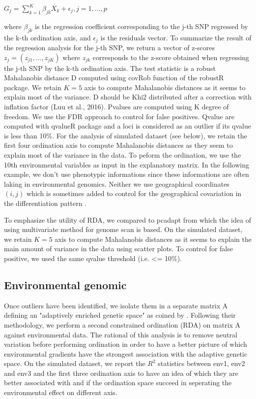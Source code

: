 \documentclass[nogrid]{MBE}%
\begin{document}
$G_j = \sum^{K}_{k=1}\beta_{jk}X_{k}+\epsilon_{j}, j=1,...,p$

where $\beta_{jk}$ is the regression coefficient corresponding to the j-th SNP regressed by the k-th ordination axis, and $\epsilon_{j}$ is the residuals vector. To summarize the result of the regression analysis for the j-th SNP, we return a vector of z-scores $z_{j} = (z_{j1}, ..., z_{jK})$ where $z_{jk}$ corresponds to the z-score obtained when regressing the j-th SNP by the k-th ordination axis.
The test statistic is a robust Mahalanobis distance D computed using covRob function of the robustR package. We retain $K=5$ axis to compute Mahalanobis distances as it seems to explain most of the variance. D should be Khi2 distributed after a correction with inflation factor (Luu et al., 2016). Pvalues are computed using K degree of freedom. We use the FDR approach to control for false positives. Qvalue are computed with qvalueR package and a loci is considered as an outlier if its qvalue is less than 10\%.
For the analysis of simulated dataset (see below), we retain the first four ordination axis to compute Mahalanobis distances  as they seem to explain most of the variance in the data. To peform the ordination, we use the 10th environmental variables as input in the explanatory matrix. In the following example, we don't use phenotypic informations since these informations are often laking in environmental genomics. Neither we use geographical coordinates $(i,j)$ which is sometimes added to control for the geographical covariation in the differentiation pattern \citep{Frichot2013}.

To emphasize the utility of RDA, we compared to pcadapt from which the idea of using multivariate method for genome scan is based. On the simulated dataset, we retain $K=5$ axis to compute Mahalanobis distances  as it seems to explain the main amount of variance in the data using scatter plots. To control for false positive, we used the same qvalue threshold (i.e. <= 10\%).


\subsection{Environmental genomic}

Once outliers have been identified, we isolate them in a separate matrix A defining an "adaptively enriched genetic space" as coined by \citet{Steane2014a}. Following their methodology, we perform a second constrained ordination (RDA) on matrix A against environmental data. The rational of this analysis is to remove neutral variation before performing ordination in order to have a better picture of which environmental gradients have the strongest association with the adaptive genetic space. On the simulated dataset, we report the $R^2$ statistics between env1, env2 and env3 and the first three ordination axis to have an idea of which they are better associated with and if the ordination space succeed in seperating the environmental effect on different axis.
\end{document}
